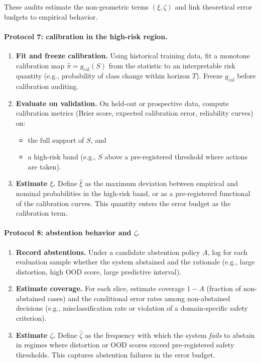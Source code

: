 \documentclass[11pt]{article}
\begin{document}
These audits estimate the non-geometric terms $(\xi,\zeta)$ and link
theoretical error budgets to empirical behavior.

\paragraph{Protocol 7: calibration in the high-risk region.}

\begin{enumerate}[label=(\arabic*)]
\item \textbf{Fit and freeze calibration.} Using historical training data,
  fit a monotone calibration map $\widehat{\pi} = g_{\mathrm{cal}}(S)$ from
  the statistic to an interpretable risk quantity (e.g., probability of
  class change within horizon $T$). Freeze $g_{\mathrm{cal}}$ before
  calibration auditing.
\item \textbf{Evaluate on validation.} On held-out or prospective data,
  compute calibration metrics (Brier score, expected calibration error,
  reliability curves) on:
  \begin{itemize}
  \item the full support of $S$, and
  \item a high-risk band (e.g., $S$ above a pre-registered threshold where
        actions are taken).
  \end{itemize}
\item \textbf{Estimate $\xi$.} Define $\widehat{\xi}$ as the maximum
  deviation between empirical and nominal probabilities in the high-risk
  band, or as a pre-registered functional of the calibration curves.
  This quantity enters the error budget as the calibration term.
\end{enumerate}

\paragraph{Protocol 8: abstention behavior and $\zeta$.}

\begin{enumerate}[label=(\arabic*)]
\item \textbf{Record abstentions.} Under a candidate abstention policy $A$,
  log for each evaluation sample whether the system abstained and the
  rationale (e.g., large distortion, high OOD score, large predictive
  interval).
\item \textbf{Estimate coverage.} For each slice, estimate coverage
  $1 - A$ (fraction of non-abstained cases) and the conditional error
  rates among non-abstained decisions (e.g., misclassification rate or
  violation of a domain-specific safety criterion).
\item \textbf{Estimate $\zeta$.} Define $\widehat{\zeta}$ as the frequency
  with which the system \emph{fails} to abstain in regimes where distortion
  or OOD scores exceed pre-registered safety thresholds. This captures
  abstention failures in the error budget.
\end{enumerate}
\end{document}
